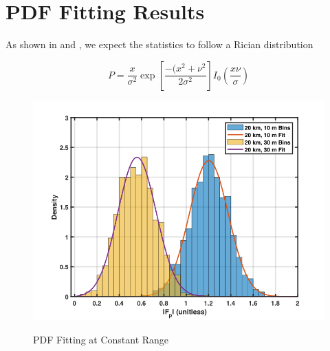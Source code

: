 \section{PDF Fitting Results}
As shown in \cite{yeh_first_principles} and \cite{yeh_fading}, we expect the statistics to follow a Rician distribution

\begin{equation}
P = \frac{x}{\sigma^2}\exp\left[\frac{-(x^2 + \nu^2}{2\sigma^2} \right]I_0\left(\frac{x\nu}{\sigma} \right)
\label{stat_eq:5}
\end{equation}
\renewcommand{\baselinestretch}{2} \small\normalsize

\begin{figure}[H]
  \begin{center}
\includegraphics[width=5in]{../media/statistics/constant_range_fit.png}
  \end{center}
  \renewcommand{\baselinestretch}{1} \small\normalsize
  \begin{quote}
    \caption[PDF Fitting at Constant Range]{PDF Fitting at Constant Range\label{stat_fig:4}}
  \end{quote}
\end{figure}
\renewcommand{\baselinestretch}{2} \small\normalsize

